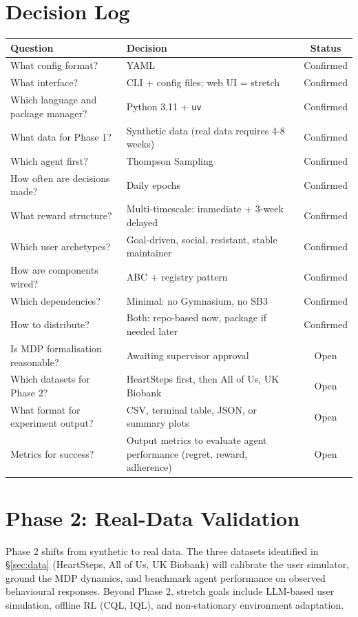 \documentclass[11pt,a4paper]{article}
\begin{document}
\section{Decision Log}
\label{sec:decisions}
\begin{table}[H]
\centering
\begin{tabular}{p{}p{}c}
\toprule
Question & Decision & Status \\
\midrule
What config format? & YAML & Confirmed \\
What interface? & CLI + config files; web UI = stretch & Confirmed \\
Which language and package manager? & Python 3.11 + \texttt{uv} & Confirmed \\
What data for Phase 1? & Synthetic data (real data requires 4-8 weeks) & Confirmed \\
Which agent first? & Thompson Sampling & Confirmed \\
How often are decisions made? & Daily epochs & Confirmed \\
What reward structure? & Multi-timescale: immediate + 3-week delayed & Confirmed \\
Which user archetypes? & Goal-driven, social, resistant, stable maintainer & Confirmed \\
How are components wired? & ABC + registry pattern & Confirmed \\
Which dependencies? & Minimal: no Gymnasium, no SB3 & Confirmed \\
How to distribute? & Both: repo-based now, package if needed later & Confirmed \\
Is MDP formalisation reasonable? & Awaiting supervisor approval & Open \\
Which datasets for Phase 2? & HeartSteps first, then All of Us, UK Biobank & Open \\
What format for experiment output? & CSV, terminal table, JSON, or summary plots & Open \\
Metrics for success? & Output metrics to evaluate agent performance (regret, reward, adherence) & Open \\
\bottomrule
\end{tabular}
\end{table}

\section{Phase 2: Real-Data Validation}

Phase 2 shifts from synthetic to real data. The three datasets identified in
\S\ref{sec:data} (HeartSteps, All of Us, UK Biobank) will calibrate the user
simulator, ground the MDP dynamics, and benchmark agent performance on
observed behavioural responses. Beyond Phase 2, stretch goals include
LLM-based user simulation, offline RL (CQL, IQL), and non-stationary
environment adaptation.
\end{document}
